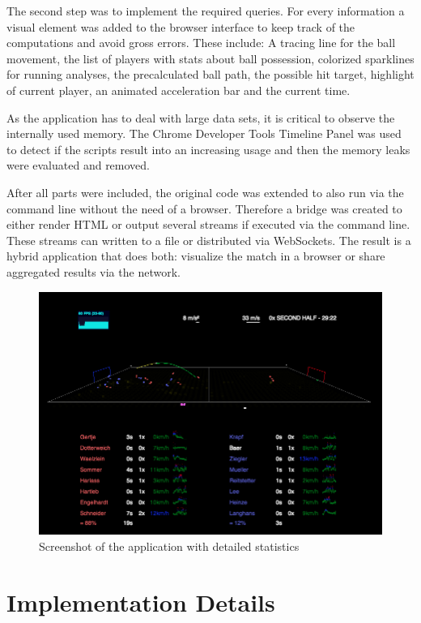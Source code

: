 \documentclass{sig-alternate}
\begin{document}
The second step was to implement the required queries.
For every information a visual element was added
to the browser interface to keep track of the computations
and avoid gross errors.
These include: A tracing line for the ball movement,
the list of players with stats about ball possession,
colorized sparklines for running analyses,
the precalculated ball path, the possible hit target,
highlight of current player, an animated acceleration bar
and the current time.

As the application has to deal with large data sets,
it is critical to observe the internally used memory.
The Chrome Developer Tools Timeline Panel was used
to detect if the scripts result into an increasing usage
and then the memory leaks were evaluated and removed.

After all parts were included, the original code
was extended to also run via the command line
without the need of a browser.
Therefore a bridge was created to either render HTML
or output several streams if executed via the command line.
These streams can written to a file or distributed via WebSockets.
The result is a hybrid application that does both:
visualize the match in a browser or share aggregated results
via the network.

\begin{figure}[t!]
  \centering
  \includegraphics[width=\linewidth]{soccer.png}
  \caption{Screenshot of the application with detailed statistics}
  \label{fig:screenshot}
\end{figure}

\section{Implementation Details}
\label{sec:implementation-details}
\end{document}
